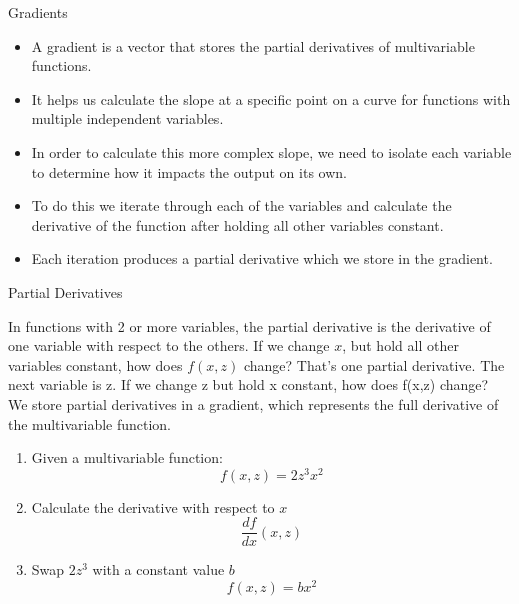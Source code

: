 \documentclass{beamer}
\begin{document}
\begin{frame}{Gradients}
\begin{itemize}
    \item A gradient is a vector that stores the partial derivatives of multivariable functions.
    \item It helps us calculate the slope at a specific point on a curve for functions with multiple independent variables.
    \item In order to calculate this more complex slope, we need to isolate each variable to determine how it impacts the output on its own.
    \item To do this we iterate through each of the variables and calculate the derivative of the function after holding all other variables constant.
    \item Each iteration produces a partial derivative which we store in the gradient.
\end{itemize}
\end{frame}

\begin{frame}{Partial Derivatives}
	\begin{flushleft}
		In functions with 2 or more variables, the partial derivative is the derivative of one variable with respect to the others. If we change $x$, but hold all other variables constant, how does $f(x,z)$ change? That’s one partial derivative. The next variable is z. If we change z but hold x constant, how does f(x,z) change? We store partial derivatives in a gradient, which represents the full derivative of the multivariable function.
	\end{flushleft}
		\begin{enumerate}
			\item Given a multivariable function:
				\begin{equation*}
					f(x,z) = 2z^3x^2
				\end{equation*}
			\item Calculate the derivative with respect to $x$
				\begin{equation*}
					\frac{df}{dx}(x,z)
				\end{equation*}
			\item Swap $2z^3$ with a constant value $b$
				\begin{equation*}
					f(x,z) = bx^2
				\end{equation*}
		\end{enumerate}
\end{frame}
\end{document}

